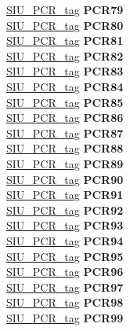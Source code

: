 \begin{DoxyCompactItemize}
\begin{tabbing}
\>\>\mbox{\hyperlink{unionSIU__tag_1_1SIU__PCR__tag}{SIU\_PCR\_tag}} {\bfseries PCR79}\\
\>\>\mbox{\hyperlink{unionSIU__tag_1_1SIU__PCR__tag}{SIU\_PCR\_tag}} {\bfseries PCR80}\\
\>\>\mbox{\hyperlink{unionSIU__tag_1_1SIU__PCR__tag}{SIU\_PCR\_tag}} {\bfseries PCR81}\\
\>\>\mbox{\hyperlink{unionSIU__tag_1_1SIU__PCR__tag}{SIU\_PCR\_tag}} {\bfseries PCR82}\\
\>\>\mbox{\hyperlink{unionSIU__tag_1_1SIU__PCR__tag}{SIU\_PCR\_tag}} {\bfseries PCR83}\\
\>\>\mbox{\hyperlink{unionSIU__tag_1_1SIU__PCR__tag}{SIU\_PCR\_tag}} {\bfseries PCR84}\\
\>\>\mbox{\hyperlink{unionSIU__tag_1_1SIU__PCR__tag}{SIU\_PCR\_tag}} {\bfseries PCR85}\\
\>\>\mbox{\hyperlink{unionSIU__tag_1_1SIU__PCR__tag}{SIU\_PCR\_tag}} {\bfseries PCR86}\\
\>\>\mbox{\hyperlink{unionSIU__tag_1_1SIU__PCR__tag}{SIU\_PCR\_tag}} {\bfseries PCR87}\\
\>\>\mbox{\hyperlink{unionSIU__tag_1_1SIU__PCR__tag}{SIU\_PCR\_tag}} {\bfseries PCR88}\\
\>\>\mbox{\hyperlink{unionSIU__tag_1_1SIU__PCR__tag}{SIU\_PCR\_tag}} {\bfseries PCR89}\\
\>\>\mbox{\hyperlink{unionSIU__tag_1_1SIU__PCR__tag}{SIU\_PCR\_tag}} {\bfseries PCR90}\\
\>\>\mbox{\hyperlink{unionSIU__tag_1_1SIU__PCR__tag}{SIU\_PCR\_tag}} {\bfseries PCR91}\\
\>\>\mbox{\hyperlink{unionSIU__tag_1_1SIU__PCR__tag}{SIU\_PCR\_tag}} {\bfseries PCR92}\\
\>\>\mbox{\hyperlink{unionSIU__tag_1_1SIU__PCR__tag}{SIU\_PCR\_tag}} {\bfseries PCR93}\\
\>\>\mbox{\hyperlink{unionSIU__tag_1_1SIU__PCR__tag}{SIU\_PCR\_tag}} {\bfseries PCR94}\\
\>\>\mbox{\hyperlink{unionSIU__tag_1_1SIU__PCR__tag}{SIU\_PCR\_tag}} {\bfseries PCR95}\\
\>\>\mbox{\hyperlink{unionSIU__tag_1_1SIU__PCR__tag}{SIU\_PCR\_tag}} {\bfseries PCR96}\\
\>\>\mbox{\hyperlink{unionSIU__tag_1_1SIU__PCR__tag}{SIU\_PCR\_tag}} {\bfseries PCR97}\\
\>\>\mbox{\hyperlink{unionSIU__tag_1_1SIU__PCR__tag}{SIU\_PCR\_tag}} {\bfseries PCR98}\\
\>\>\mbox{\hyperlink{unionSIU__tag_1_1SIU__PCR__tag}{SIU\_PCR\_tag}} {\bfseries PCR99}\\

\end{tabbing}
\end{DoxyCompactItemize}
